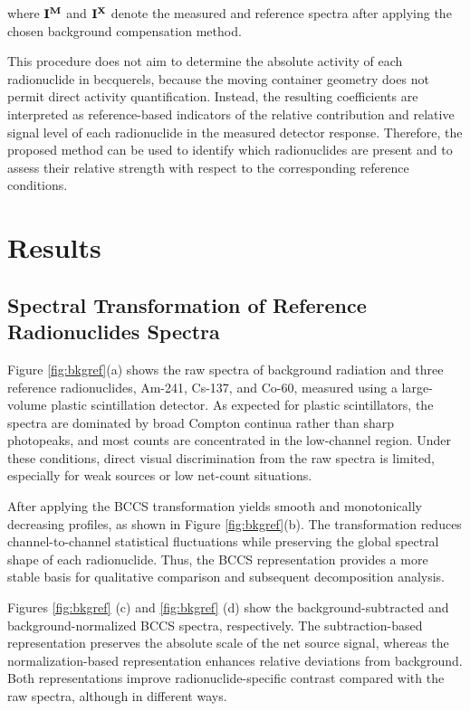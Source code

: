 \documentclass[10pt]{wlscirep}
\begin{document}
where $\bf{I}^M$ and $\bf{I}^{X}$ denote the measured and reference spectra after applying the chosen background compensation method.

This procedure does not aim to determine the absolute activity of each radionuclide in becquerels, because the moving container geometry does not permit direct activity quantification. Instead, the resulting coefficients are interpreted as reference-based indicators of the relative contribution and relative signal level of each radionuclide in the measured detector response. Therefore, the proposed method can be used to identify which radionuclides are present and to assess their relative strength with respect to the corresponding reference conditions.

\section*{Results}


\subsection*{Spectral Transformation of Reference Radionuclides Spectra}

Figure \ref{fig:bkgref}(a) shows the raw spectra of background radiation and three reference radionuclides, Am-241, Cs-137, and Co-60, measured using a large-volume plastic scintillation detector. As expected for plastic scintillators, the spectra are dominated by broad Compton continua rather than sharp photopeaks, and most counts are concentrated in the low-channel region. Under these conditions, direct visual discrimination from the raw spectra is limited, especially for weak sources or low net-count situations.

After applying the BCCS transformation yields smooth and monotonically decreasing profiles, as shown in Figure \ref{fig:bkgref}(b). The transformation reduces channel-to-channel statistical fluctuations while preserving the global spectral shape of each radionuclide. Thus, the BCCS representation provides a more stable basis for qualitative comparison and subsequent decomposition analysis. 

Figures \ref{fig:bkgref} (c) and \ref{fig:bkgref} (d) show the background-subtracted and background-normalized BCCS spectra, respectively. The subtraction-based representation preserves the absolute scale of the net source signal, whereas the normalization-based representation enhances relative deviations from background. Both representations improve radionuclide-specific contrast compared with the raw spectra, although in different ways.
\end{document}
